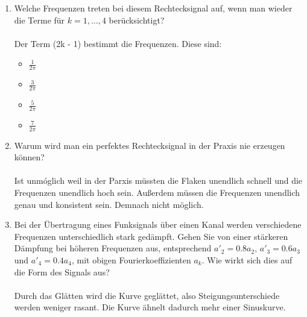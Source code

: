 \documentclass[a4paper]{article}
\begin{document}
\begin{enumerate}[label=\alph*)]
    \item Welche Frequenzen treten bei diesem Rechtecksignal auf, wenn man wieder die Terme für $k = 1, \dots , 4$ berücksichtigt?\\\\
    Der Term (2k - 1) bestimmt die Frequenzen. Diese sind:
    \begin{itemize}
        \item $\frac{1}{2\pi}$
        \item $\frac{3}{2\pi}$
        \item $\frac{5}{2\pi}$
        \item $\frac{7}{2\pi}$
    \end{itemize}
    \item Warum wird man ein perfektes Rechtecksignal in der Praxis nie erzeugen können?\\\\
    Ist unmóglich weil in der Parxis müssten die Flaken unendlich schnell und die Frequenzen unendlich hoch sein. Außerdem müssen die Frequenzen unendlich genau und konsistent sein. Demnach nicht möglich.
    \item Bei der Übertragung eines Funksignals über einen Kanal werden verschiedene Frequenzen unterschiedlich stark gedämpft. Gehen Sie von einer stärkeren Dämpfung bei höheren Frequenzen aus, entsprechend $a'_2 = 0.8 a_2,\, a'_3 = 0.6 a_3$ und $a'_4 = 0.4 a_4$, mit obigen Fourierkoeffizienten $a_k$. Wie wirkt sich dies auf die Form des Signals aus?\\\\
    Durch das Glätten wird die Kurve geglättet, also Steigungsunterschiede werden weniger rasant. Die Kurve ähnelt dadurch mehr einer Sinuskurve.
\end{enumerate}
\end{document}
